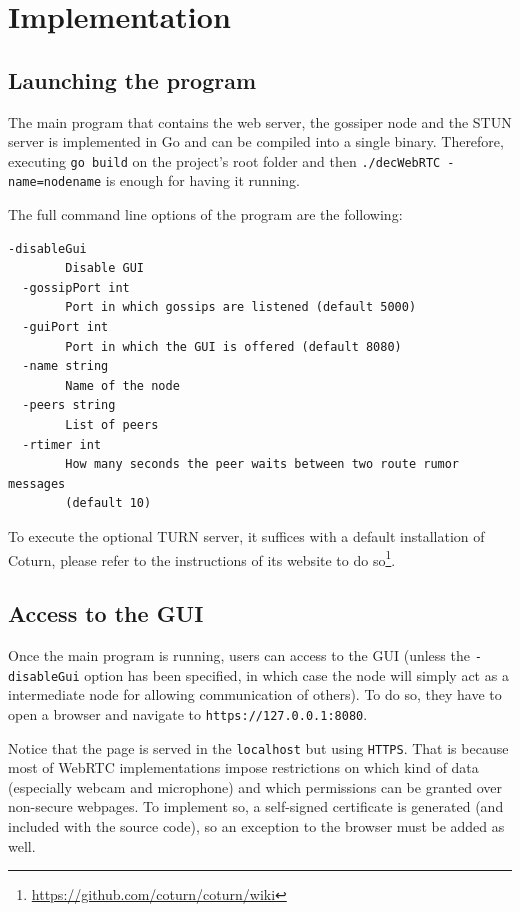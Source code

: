 \documentclass[paper=a4, fontsize=11pt]{scrartcl} %
\numberwithin{equation}{section} %
\numberwithin{figure}{section} %
\numberwithin{table}{section} %
\begin{document}
\section{Implementation}

\subsection{Launching the program}

The main program that contains the web server, the gossiper node and the STUN server is implemented in Go and can be compiled into a single binary. Therefore, executing \verb|go build| on the project's root folder and then \verb|./decWebRTC -name=nodename| is enough for having it running.

The full command line options of the program are the following:

\begin{verbatim}
-disableGui
    	Disable GUI
  -gossipPort int
    	Port in which gossips are listened (default 5000)
  -guiPort int
    	Port in which the GUI is offered (default 8080)
  -name string
    	Name of the node
  -peers string
    	List of peers
  -rtimer int
    	How many seconds the peer waits between two route rumor messages 
    	(default 10)
\end{verbatim}

To execute the optional TURN server, it suffices with a default installation of Coturn, please refer to the instructions of its website to do so\footnote{\url{https://github.com/coturn/coturn/wiki}}.

\subsection{Access to the GUI}

Once the main program is running, users can access to the GUI (unless the \verb|-disableGui| option has been specified, in which case the node will simply act as a intermediate node for allowing communication of others). To do so, they have to open a browser and navigate to \verb|https://127.0.0.1:8080|.

Notice that the page is served in the \verb|localhost| but using \verb|HTTPS|. That is because most of WebRTC implementations impose restrictions on which kind of data (especially webcam and microphone) and which permissions can be granted over non-secure webpages. To implement so, a self-signed certificate is generated (and included with the source code), so an exception to the browser must be added as well.
\end{document}
